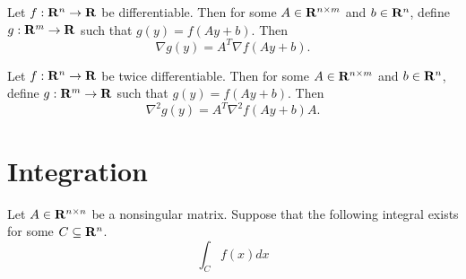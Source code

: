 \begin{corollary}
\label{corollary:dixu}
Let $f:\mathbf{R}^n\to\mathbf{R}$ be differentiable.
Then for some $A\in\mathbf{R}^{n\times m}$ and $b\in\mathbf{R}^n$,
define $g:\mathbf{R}^m\to\mathbf{R}$ such that $g(y) = f(Ay+b)$.
Then
\begin{equation}
\label{eq:dixu}
\nabla g(y) = A^T \nabla f(Ay+b).
\end{equation}
\end{corollary}


\begin{corollary}
\label{corollary:eicg}
Let $f:\mathbf{R}^n\to\mathbf{R}$ be twice differentiable.
Then for some $A\in\mathbf{R}^{n\times m}$ and $b\in\mathbf{R}^n$,
define $g:\mathbf{R}^m\to\mathbf{R}$ such that $g(y) = f(Ay+b)$.
Then
\begin{equation}
\label{eq:eicg}
\nabla^2 g(y) = A^T \nabla^2 f(Ay+b)A.
\end{equation}
\end{corollary}

\section{Integration}


\begin{lemma}
Let $A\in\mathbf{R}^{n\times n}$ be a nonsingular matrix. Suppose that the following integral exists for some $C\subseteq \mathbf{R}^n$.
\begin{equation}
\int_{C} f(x) dx
\end{equation}
\end{lemma}





